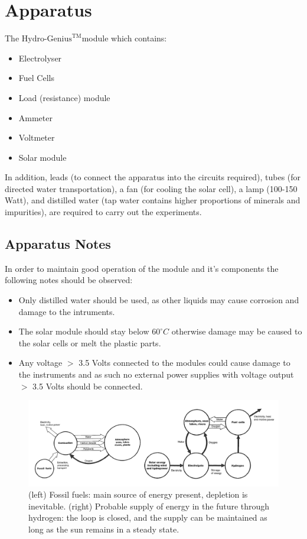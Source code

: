 \documentclass{article}
\begin{document}
    \section{Apparatus}
    The \(\text{Hydro-Genius}^{\text{TM}}\)module which contains:
    \begin{itemize}
        \item Electrolyser
        \item Fuel Cells
        \item Load (resistance) module
        \item Ammeter
        \item Voltmeter
        \item Solar module
    \end{itemize}
    In addition, leads (to connect the apparatus into the circuits required), tubes (for directed water transportation), 
    a fan (for cooling the solar cell), a lamp (100-150 Watt), and distilled water (tap water contains higher proportions of minerals 
    and impurities), are required to carry out the experiments.
    \subsection{Apparatus Notes}
    In order to maintain good operation of the module and it's components the following notes should be observed:
    \begin{itemize}
        \item Only distilled water should be used, as other liquids may cause corrosion and damage to the intruments.
        \item The solar module should stay below \(60^\circ C\) otherwise damage may be caused to the solar cells or melt the plastic 
        parts.
        \item Any voltage \(>\) 3.5 Volts connected to the modules could cause damage to the instruments and as such no external power supplies 
        with voltage output \(>\) 3.5 Volts should be connected.
    \end{itemize}
    \begin{figure}
        \centering
        \includegraphics[scale=0.25]{./cycle.png}
        \caption{(left) Fossil fuels: main source of energy present, depletion is inevitable. (right) 
        Probable supply of energy in the future through hydrogen: the loop is closed, and the supply can be maintained 
        as long as the sun remains in a steady state. \cite{SCE}}
    \end{figure}
\end{document}
